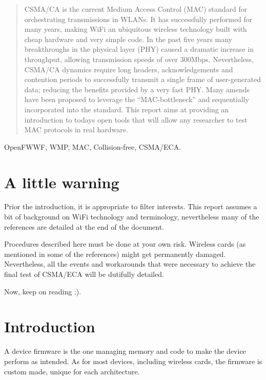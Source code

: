\documentclass[conference]{IEEEtran}
\begin{document}
\begin{abstract}

\boldmath CSMA/CA is the current Medium Access Control (MAC) standard for orchestrating transmissions in WLANs. It has successfully performed for many years, making WiFi an ubiquitous wireless technology built with cheap hardware and very simple code. In the past five years many breakthroughs in the physical layer (PHY) caused a dramatic increase in throughput, allowing transmission speeds of over 300Mbps. Nevertheless, CSMA/CA dynamics require long headers, acknowledgements and contention periods to successfully transmit a single frame of user-generated data; reducing the benefits provided by a very fast PHY. Many amends have been proposed to leverage the ``MAC-bottleneck'' and sequentially incorporated into the standard. This report aims at providing an introduction to todays open tools that will allow any researcher to test MAC protocols in real hardware.

\end{abstract}

\begin{IEEEkeywords}
OpenFWWF, WMP, MAC, Collision-free, CSMA/ECA.
\end{IEEEkeywords}

\section*{A little warning} \label{warning}
Prior the introduction, it is appropriate to filter interests. This report assumes a bit of background on WiFi technology and terminology, nevertheless many of the references are detailed at the end of the document.

Procedures described here must be done at your own risk. Wireless cards (as mentioned in some of the references) might get permanently damaged. Nevertheless, all the events and workarounds that were necessary to achieve the final test of CSMA/ECA will be dutifully detailed.

Now, keep on reading :).

\section{Introduction}\label{introduction}
A device firmware is the one managing memory and code to make the device perform as intended. As for most devices, including wireless cards, the firmware is custom made, unique for each architecture.
\end{document}
